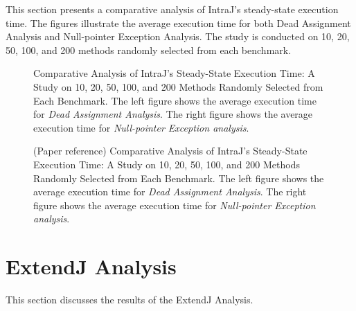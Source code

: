 \documentclass[acmsmall, screen, review, nonacm]{acmart}
\begin{document}
This section presents a comparative analysis of IntraJ's steady-state execution time. The figures illustrate the average execution time for both Dead Assignment Analysis and Null-pointer Exception Analysis. The study is conducted on 10, 20, 50, 100, and 200 methods randomly selected from each benchmark.
\begin{figure}[H]
  \centering
  \caption{Comparative Analysis of IntraJ's Steady-State Execution Time: A Study on 10, 20, 50, 100, and 200 Methods Randomly Selected from Each Benchmark. 
  The left figure shows the average execution time for \emph{Dead Assignment Analysis}. The right figure shows the average execution time for \emph{Null-pointer Exception analysis}.}
\end{figure}


\begin{figure}[H]
  \centering
  \caption{(Paper reference) Comparative Analysis of IntraJ's Steady-State Execution Time: A Study on 10, 20, 50, 100, and 200 Methods Randomly Selected from Each Benchmark. 
  The left figure shows the average execution time for \emph{Dead Assignment Analysis}. The right figure shows the average execution time for \emph{Null-pointer Exception analysis}.}
\end{figure}

\section{ExtendJ Analysis}
This section discusses the results of the ExtendJ Analysis.


\end{document}
